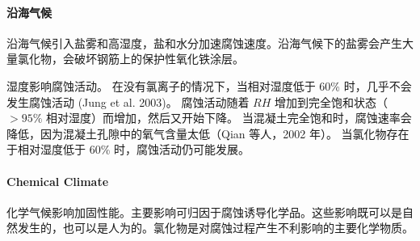 \paragraph{沿海气候}
沿海气候引入盐雾和高湿度，盐和水分加速腐蚀速度。沿海气候下的盐雾会产生大量氯化物，会破坏钢筋上的保护性氧化铁涂层。

湿度影响腐蚀活动。 在没有氯离子的情况下，当相对湿度低于 60\% 时，几乎不会发生腐蚀活动 (Jung et al. 2003)。 腐蚀活动随着 $RH$ 增加到完全饱和状态（$>95\%$ 相对湿度）而增加，然后又开始下降。 当混凝土完全饱和时，腐蚀速率会降低，因为混凝土孔隙中的氧气含量太低（Qian 等人，2002 年）。 当氯化物存在于相对湿度低于 60\% 时，腐蚀活动仍可能发展。

\paragraph{Chemical Climate}
化学气候影响加固性能。主要影响可归因于腐蚀诱导化学品。这些影响既可以是自然发生的，也可以是人为的。氯化物是对腐蚀过程产生不利影响的主要化学物质。

